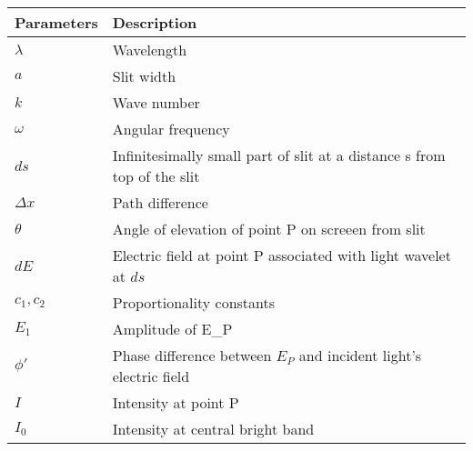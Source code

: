 \begin{tabular}{|p{2.5cm}|p{5.5cm}|}
\hline
\textbf{Parameters} & \textbf{Description} \\
\hline
$\lambda$ & Wavelength \\
\hline
$a$ & Slit width \\
\hline
$k$ & Wave number\\
\hline
$\omega$ & Angular frequency\\
\hline
$ds$ & Infinitesimally small part of slit at a distance s from top of the slit\\
\hline
$\Delta x$ & Path difference\\
\hline
$\theta$ & Angle of elevation of point P on screeen from slit\\
\hline
$dE$& Electric field at point P associated with light wavelet at $ds$\\
\hline
$c_1, c_2$ & Proportionality constants \\
\hline
$E_1$ & Amplitude of E_P\\
\hline
$\phi' $ & Phase difference between $E_P$ and incident light's electric field\\
\hline
$I$& Intensity at point P\\
\hline
$I_0$ & Intensity at central bright band\\
\hline
\end{tabular}
